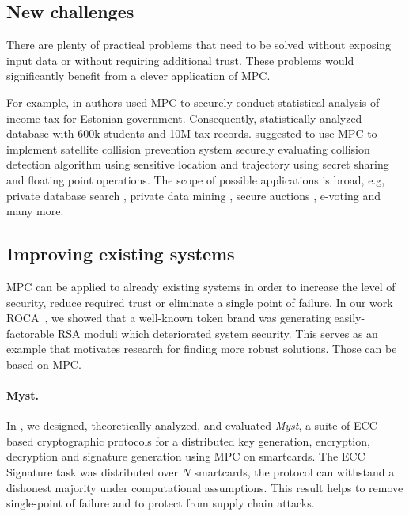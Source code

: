 \documentclass[
  digital, %
  twoside, %
  table,   %
  lof,     %
  lot,     %
]{fithesis3}
\newcounter{ph4_show_guides}
\theoremstyle{definition}
\theoremstyle{remark}
\begin{document}
\subsection{New challenges} %
There are plenty of practical problems that need to be solved without exposing input data or without requiring additional trust. These problems would significantly benefit from a clever application of MPC.

For example, in \cite{BJSV15} authors used MPC to securely conduct statistical analysis of income tax for Estonian government. Consequently, \cite{BKKRST16} statistically analyzed database with 600k students and 10M tax records. \cite{KW15} suggested to use MPC to implement satellite collision prevention system securely evaluating collision detection algorithm using sensitive location and trajectory using secret sharing and floating point operations. The scope of possible applications is broad, e.g,  private database search \cite{Bertino2005, Naor:1999:PPA:336992.337028}, private data mining \cite{Aldeen2015}, secure auctions \cite{Bogetoft:2006:PIS:2165197.2165211}, e-voting \cite{DBLP:journals/corr/NairBK15} and many more.

\subsection{Improving existing systems}
MPC can be applied to already existing systems in order to increase the level of security, reduce required trust or eliminate a single point of failure.
In our work ROCA~\cite{2017-ccs-nemec}, we showed that a well-known token brand was generating easily-factorable RSA moduli which deteriorated system security. This serves as an example that motivates research for finding more robust solutions. Those can be based on MPC.
    
\paragraph{Myst.} In \cite{2017-ccs-mavroudis}, we designed, theoretically analyzed, and evaluated \emph{Myst}, a suite of ECC-based cryptographic protocols for a distributed key generation, encryption, decryption and signature generation using MPC on smartcards.
The ECC Signature task was distributed over $N$ smartcards, the protocol can withstand a dishonest majority under computational assumptions. This result helps to remove single-point of failure and to protect from supply chain attacks.
    
\end{document}
